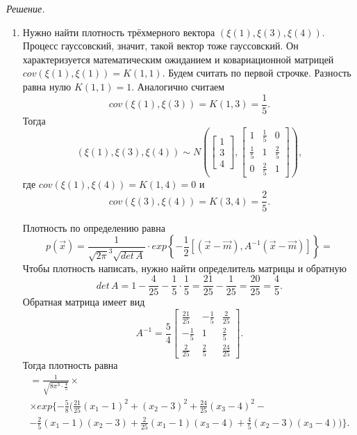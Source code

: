 \textit{Решение.}
\begin{enumerate}[label=\alph*)]
  \item Нужно найти плотность трёхмерного вектора
  $ \left( \xi \left( 1 \right), \xi \left( 3 \right), \xi \left( 4 \right) \right) $.
  Процесс гауссовский, значит, такой вектор тоже гауссовский.
  Он характеризуется математическим ожиданием и ковариационной матрицей
  $cov \left( \xi \left( 1 \right), \xi \left( 1 \right) \right) = K \left( 1, 1 \right) $.
  Будем считать по первой строчке.
  Разность равна нулю $K \left( 1, 1 \right) = 1$.
  Аналогично считаем
  $$cov \left( \xi \left( 1 \right), \xi \left( 3 \right) \right) =
    K \left( 1, 3 \right) =
    \frac{1}{5}.$$
  Тогда
  $$ \left( \xi \left( 1 \right), \xi \left( 3 \right), \xi \left( 4 \right) \right)  \sim
    N \left(
      \begin{bmatrix}
        1 \\
        3 \\
        4
      \end{bmatrix},
      \begin{bmatrix}
        1 & \frac{1}{5} & 0 \\
        \frac{1}{5} & 1 & \frac{2}{5} \\
        0 & \frac{2}{5} & 1
      \end{bmatrix}
    \right),$$
  где $cov \left( \xi \left( 1 \right), \xi \left( 4 \right) \right) = K \left( 1, 4 \right) = 0$ и
  $$cov \left( \xi \left( 3 \right), \xi \left( 4 \right) \right) =
    K \left( 3, 4 \right) =
    \frac{2}{5}.$$

  Плотность по определению равна
  $$p \left( \vec{x} \right) =
    \frac{1}{ \sqrt{2 \pi }^3 \sqrt{det \, A}} \cdot
    exp \left\{ -\frac{1}{2}
      \left[ \left( \vec{x} - \vec{m} \right), A^{-1} \left( \vec{x} - \vec{m} \right)
      \right] \right\} =$$
  Чтобы плотность написать, нужно найти определитель матрицы и обратную
  $$det \, A =
    1 - \frac{4}{25} - \frac{1}{5} \cdot \frac{1}{5} =
    \frac{21}{25} - \frac{1}{25} =
    \frac{20}{25} =
    \frac{4}{5}.$$
  Обратная матрица имеет вид
  $$A^{-1} =
    \frac{5}{4}
    \begin{bmatrix}
      \frac{21}{25} & -\frac{1}{5} & \frac{2}{25} \\
      -\frac{1}{5} & 1 & \frac{2}{5} \\
      \frac{2}{25} & \frac{2}{5} & \frac{24}{25}
    \end{bmatrix}.$$
  Тогда плотность равна
  \begin{gather*}
    = \frac{1}{ \sqrt{8 \pi^3 \cdot \frac{4}{5}}} \times \\
    \times exp\{ -\frac{5}{8}
      ( \frac{21}{25} \left( x_1 - 1 \right)^2 + \left( x_2 - 3 \right)^2 +
      \frac{24}{25} \left( x_3 - 4 \right)^2 - \\
      - \frac{2}{5} \left( x_1 - 1 \right) \left( x_2 - 3 \right) +
      \frac{2}{25} \left( x_1 - 1 \right) \left( x_3 - 4 \right) +
      \frac{4}{5} \left( x_2 - 3 \right) \left( x_3 - 4 \right) )\}.
  \end{gather*}


\end{enumerate}
